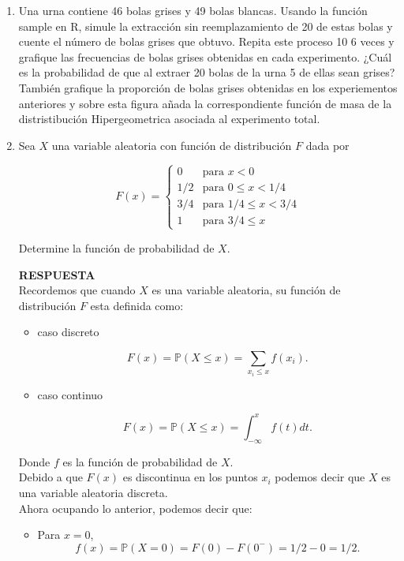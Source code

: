 \documentclass[11pt,letterpaper]{article}
\newcommand{\mP}{\mathbb{P}}
\newcommand{\res}{\textbf{RESPUESTA}\\}
\begin{document}
\begin{enumerate}
\item Una urna contiene 46 bolas grises y 49 bolas blancas. Usando la función sample en R, simule
la extracción sin reemplazamiento de 20 de estas bolas y cuente el número de bolas grises que
obtuvo. Repita este proceso 10 6 veces y grafique las frecuencias de bolas grises obtenidas en
cada experimento. ¿Cuál es la probabilidad de que al extraer 20 bolas de la urna 5 de ellas
sean grises? También grafique la proporción de bolas grises obtenidas en los experiementos anteriores y sobre esta figura añada la correspondiente función de masa de la distristibución Hipergeometrica asociada al experimento total.

\item Sea $X$ una variable aleatoria con función de distribución $F$ dada por

\begin{equation*}
F(x) = \left\{\begin{array}{ll}
0 & \text{para } x<0\\
1/2 & \text{para } 0 \leq x <1/4\\
3/4 & \text{para } 1/4\leq x< 3/4\\
1 & \text{para } 3/4 \leq x
\end{array} \right.
\end{equation*}

Determine la función de probabilidad de $X$.

\res 

Recordemos que cuando $X$ es una variable aleatoria, su función de distribución $F$ esta definida como:

\begin{itemize}
\item caso discreto

$$F(x) =\mP(X\leq x)= \sum_{x_i\leq x} f(x_i).$$

\item caso continuo

$$F(x) = \mP(X\leq x)= \int_{-\infty}^x f(t) dt.$$
\end{itemize}
Donde $f$ es la función de probabilidad de $X$. \\

Debido a que $F(x)$ es discontinua en los puntos $x_i$ podemos decir que $X$ es una variable aleatoria discreta.\\
Ahora ocupando lo anterior, podemos decir que:
\begin{itemize}
\item Para $x=0$,
$$ f(x)= \mP(X=0)= F(0)-F({0}^-)=1/2-0=1/2.$$


\end{itemize}
\end{enumerate}
\end{document}
